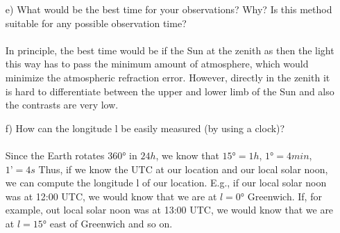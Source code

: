 \begin{itemize}
\item[e)] What would be the best time for your observations? Why? Is this method suitable for any possible observation time?
\\ \\ 
In principle, the best time would be if the Sun at the zenith as then the light this way has to pass the minimum amount of atmosphere, which would minimize the atmospheric refraction error. However, directly in the zenith it is hard to differentiate between the upper and lower limb of the Sun and also the contrasts are very low.
\item[f)]How can the longitude l be easily measured (by using a clock)?
\\ \\
Since the Earth rotates $360°$ in $24h$, we know that $15° = 1h$, $1° = 4min$, $1’ = 4s$
Thus, if we know the UTC at our location and our local solar noon, we can compute the longitude l of our location. 
E.g., if our local solar noon was at 12:00 UTC, we would know that we are at $l=0$° Greenwich. If, for example, out local solar noon was at 13:00 UTC, we would know that we are at $l=15°$ east of Greenwich and so on. 
\end{itemize}